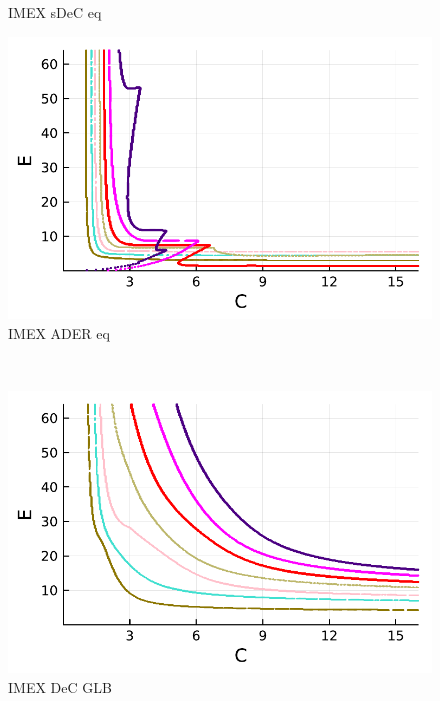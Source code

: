 \begin{figure}
\begin{minipage}[t]{0.32\textwidth}
		\centering
		IMEX sDeC eq
	\end{minipage}
	\begin{minipage}[t]{0.32\textwidth}
		\includegraphics[width=\textwidth]{pdf/pdepics/diff/IMEXADER_equispaced_TMM_ord_2-8.pdf}
		\centering
		IMEX ADER eq
	\end{minipage} \\
	\begin{minipage}[t]{0.32\textwidth}
		\includegraphics[width=\textwidth]{pdf/pdepics/diff/IMEXDeC_gaussLobatto_TMM_ord_2-8.pdf}
		\centering
		IMEX DeC GLB
	\end{minipage} 
	\begin{minipage}[t]{0.32\textwidth}

\end{minipage}
\end{figure}
